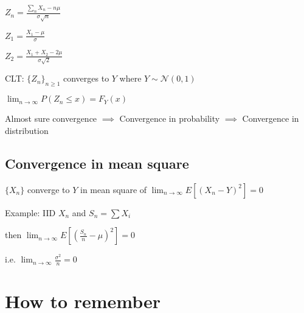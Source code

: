 \documentclass{article}
\begin{document}
$Z_n = \frac{\sum_n X_n - n\mu}{\sigma \sqrt{n}}$

$Z_1 = \frac{X_1-\mu}{\sigma}$

$Z_2 = \frac{X_1+X_2-2\mu}{\sigma\sqrt{2}}$

CLT: $\{ Z_n \}_{n\geq 1}$ converges to $Y$ where $Y \sim \mathcal{N}(0,1)$

$\lim_{n\longrightarrow \infty} P(Z_n \leq x) = F_Y(x)$ 

Almost sure convergence $\implies$ Convergence in probability $\implies$ Convergence in distribution


\subsection*{Convergence in mean square}

$\{X_n\}$ converge to $Y$ in mean square of $\lim_{n \longrightarrow \infty }E[(X_n-Y)^2] =0$


Example: IID $X_n$ and $S_n = \sum X_i$

then $\lim_{n \longrightarrow \infty}E[(\frac{S_n}{n}- \mu)^2] = 0$

i.e. $\lim_{n \longrightarrow \infty} \frac{\sigma^2}{n} = 0$

\section{How to remember}
\end{document}
